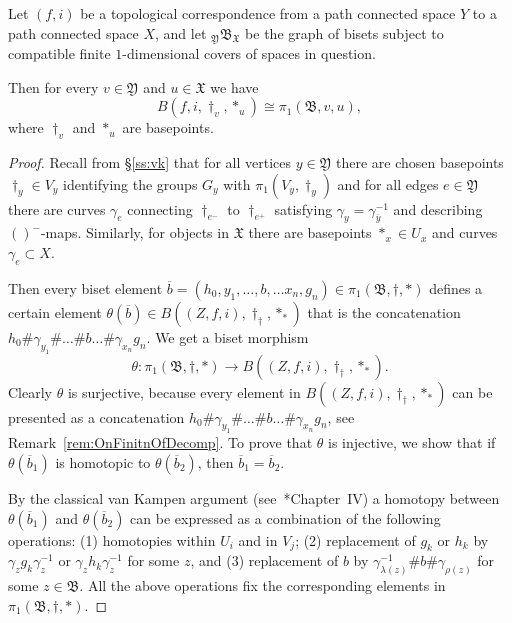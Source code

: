 \documentclass{amsart}
\begin{document}
\begin{thm}\label{thm:vankampenbis}
  Let $(f,i)$ be a topological correspondence from a path connected
  space $Y$ to a path connected space $X$, and let
  $ {}_{\mathfrak Y}\mathfrak B_{\mathfrak X}$ be the graph of bisets
  subject to compatible finite $1$-dimensional covers of spaces in
  question.
  
  Then for every $v\in\mathfrak Y$ and $u\in\mathfrak X$ we have
  \[B(f,i,\dagger_v,*_u)\cong \pi_1(\mathfrak B, v,u),\]
  where $\dagger_v$ and $*_u$ are basepoints. 
\end{thm}
\begin{proof}
  Recall from \S\ref{ss:vk} that for all vertices $y\in \mathfrak Y$ there
  are chosen basepoints $\dagger_y\in V_y$ identifying the groups $G_y$
  with $\pi_1(V_y, \dagger_y)$ and for all edges $e\in\mathfrak Y$ there
  are curves $\gamma_e$ connecting $\dagger_{e^-}$ to $\dagger_{e^+}$
  satisfying $\gamma_y=\gamma^{-1}_{\overline y}$ and describing
  $()^-$-maps. Similarly, for objects in $\mathfrak X$ there are
  basepoints $*_x\in U_x$ and curves $\gamma_e\subset X$.

  Then every biset element $\overline b=(h_0,y_1,\dots,b,\dots x_n,g_n)\in
  \pi_1(\mathfrak B,\dagger, *)$ defines a certain element
  $\theta(\overline b)\in B((Z,f,i),\dagger_\dagger,*_*)$ that is the
  concatenation $h_0\#\gamma_{y_1}\#\dots\#b\dots\# \gamma_{x_n}g_n$. We
  get a biset morphism
  \[\theta\colon \pi_1(\mathfrak B,\dagger,*)\to B((Z,f,i),\dagger_\dagger,*_*).
  \]
  Clearly $\theta$ is surjective, because every element in
  $B((Z,f,i),\dagger_\dagger,*_*)$ can be presented as a concatenation
  $h_0\#\gamma_{y_1}\#\dots\#b\dots\# \gamma_{x_n}g_n$, see
  Remark~\ref{rem:OnFinitnOfDecomp}. To prove that $\theta$ is injective,
  we show that if $\theta(\overline b_1)$ is homotopic to $\theta(\overline
  b_2)$, then $\overline b_1=\overline b_2$.

  By the classical van Kampen argument (see~\cite{massey:at}*{Chapter~IV})
  a homotopy between $\theta(\overline b_1)$ and $\theta(\overline b_2)$
  can be expressed as a combination of the following operations: (1)
  homotopies within $U_i$ and in $V_j$; (2) replacement of $g_k$ or $h_k$
  by $\gamma_{z} g_k\gamma^{-1}_{z}$ or $\gamma_{z} h_k\gamma^{-1}_{z}$ for
  some $z$, and (3) replacement of $b$ by
  $\gamma^{-1}_{\lambda(z)}\#b\#\gamma_{\rho(z)}$ for some $z\in \mathfrak
  B$.  All the above operations fix the corresponding elements in
  $\pi_1(\mathfrak B,\dagger,*)$.
\end{proof}
\end{document}
